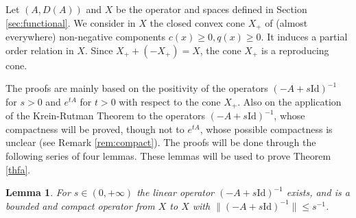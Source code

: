 \documentclass[a4paper]{article}
\newtheorem{lemma}[thm]{Lemma}
\def\Id{\rm{Id}}
\def\Id{\mathrm{Id}}
\numberwithin{equation}{section}
\begin{document}
Let $(A,D(A))$ and $X$ be the operator and spaces defined in Section \ref{sec:functional}. We consider in $X$ the closed convex cone $X_+$ of (almost everywhere) non-negative components $c(x)\ge 0, q(x)\ge 0$. It induces a partial order relation in $X$. Since $X_++(-X_+)=X$, the cone $X_+$ is a reproducing cone.

The proofs are mainly based on the positivity of the operators $(-A+s\Id)^{-1}$ for $s>0$ and $e^{tA}$ for $t>0$ with respect to the cone $X_+$. Also on the application of the Krein-Rutman Theorem to the operators $(-A+s\Id)^{-1}$, whose compactness will be proved, though not to  $e^{tA}$, whose possible compactness is unclear (see Remark \ref{rem:compact}). The proofs will be done through the following series of four lemmas. These lemmas will be used to prove Theorem \ref{thfa}.
\begin{lemma}\label{invers}
For $s\in(0,+\infty)$ the linear operator $(-A+s \Id)^{-1}$ exists, and is a bounded and compact operator from $X$ to $X$ with $\|(-A+s \Id)^{-1}\|\le s^{-1}$.
\end{lemma}
\end{document}
